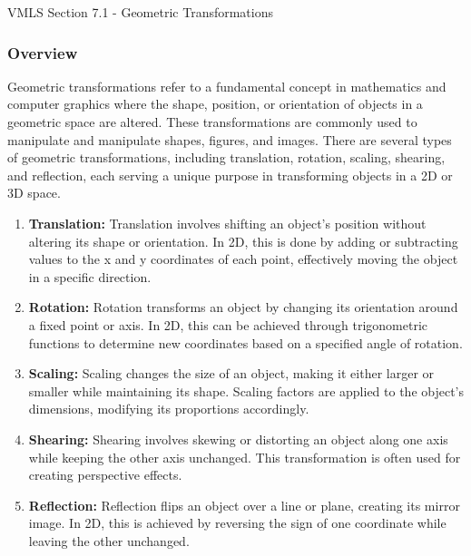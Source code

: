 \begin{notes}{VMLS Section 7.1 - Geometric Transformations}
    \subsubsection*{Overview}

    Geometric transformations refer to a fundamental concept in mathematics and computer graphics where the shape, position, or orientation of objects in a geometric space are altered. These transformations 
    are commonly used to manipulate and manipulate shapes, figures, and images. There are several types of geometric transformations, including translation, rotation, scaling, shearing, and reflection, each 
    serving a unique purpose in transforming objects in a 2D or 3D space.

    \begin{enumerate}
        \item \textbf{Translation:} Translation involves shifting an object's position without altering its shape or orientation. In 2D, this is done by adding or subtracting values to the x and y coordinates 
        of each point, effectively moving the object in a specific direction.
        
        \item \textbf{Rotation:} Rotation transforms an object by changing its orientation around a fixed point or axis. In 2D, this can be achieved through trigonometric functions to determine new coordinates 
        based on a specified angle of rotation.
        
        \item \textbf{Scaling:} Scaling changes the size of an object, making it either larger or smaller while maintaining its shape. Scaling factors are applied to the object's dimensions, modifying its 
        proportions accordingly.
        
        \item \textbf{Shearing:} Shearing involves skewing or distorting an object along one axis while keeping the other axis unchanged. This transformation is often used for creating perspective effects.
        
        \item \textbf{Reflection:} Reflection flips an object over a line or plane, creating its mirror image. In 2D, this is achieved by reversing the sign of one coordinate while leaving the other unchanged.
    \end{enumerate}


\end{notes}
